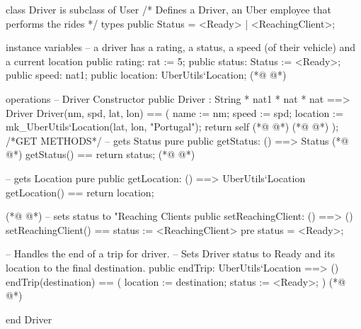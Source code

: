 \begin{vdmpp}[breaklines=true]
class Driver is subclass of User
/*
  Defines a Driver, an Uber employee that performs the rides
*/
types
    public Status = <Ready> | <ReachingClient>;

instance variables
    -- a driver has a rating, a status, a speed (of their vehicle) and a current location
    public rating: rat := 5;
    public status: Status := <Ready>;
    public speed: nat1;
    public location: UberUtils`Location;
(*@
\label{Driver:14}
@*)

operations
  -- Driver Constructor
    public Driver : String * nat1 * nat * nat ==> Driver
        Driver(nm, spd, lat, lon) == (
            name := nm;
            speed := spd;
            location := mk_UberUtils`Location(lat, lon, "Portugal");
            return self
(*@
\label{setReady:23}
@*)
(*@
\label{getStatus:23}
@*)
        );
    /*GET METHODS*/
  -- gets Status
  pure public getStatus: () ==> Status
(*@
\label{getLocation:27}
@*)
  getStatus() == return status;
(*@
\label{setReachingClient:28}
@*)
  
   -- gets Location
  pure public getLocation: () ==> UberUtils`Location
  getLocation() == return location;
  
(*@
\label{setInTransit:33}
@*)
    -- sets status to "Reaching Clients    
    public setReachingClient: () ==> ()
        setReachingClient() ==
            status := <ReachingClient>
            pre status = <Ready>;
    
    -- Handles the end of a trip for driver.
    -- Sets Driver status to Ready and its location to the final destination.
    public endTrip: UberUtils`Location ==> ()
      endTrip(destination) == (
        location := destination;
        status := <Ready>;
      )
(*@
\label{endTrip:46}
@*)

end Driver
\end{vdmpp}

